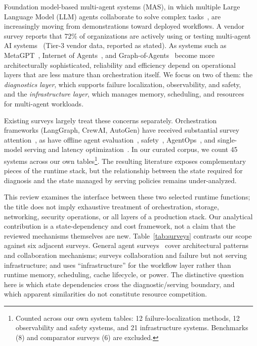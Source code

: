 Foundation model-based multi-agent systems (MAS), in which multiple Large Language Model (LLM) agents collaborate to solve complex tasks~\cite{metagpt2024, camel2023, chatdev2024}, are increasingly moving from demonstrations toward deployed workflows. A vendor survey reports that 72\% of organizations are actively using or testing multi-agent AI systems~\cite{zapier2025} (Tier-3 vendor data, reported as stated). As systems such as MetaGPT~\cite{metagpt2024}, Internet of Agents~\cite{ioa2025}, and Graph-of-Agents~\cite{graphofagents2026} become more architecturally sophisticated, reliability and efficiency depend on operational layers that are less mature than orchestration itself. We focus on two of them: the \emph{diagnostics layer}, which supports failure localization, observability, and safety, and the \emph{infrastructure layer}, which manages memory, scheduling, and resources for multi-agent workloads.

Existing surveys largely treat these concerns separately. Orchestration frameworks (LangGraph, CrewAI, AutoGen) have received substantial survey attention~\cite{zhu2026orchestration}, as have offline agent evaluation~\cite{evalbenchmark2025, evalagents2026, llmbenchsurvey2025}, safety~\cite{safellmagentsurvey2026, trustworthyagents2025}, AgentOps~\cite{agentopssurvey2025, agentopscsiro2024, architectingops2026}, and single-model serving and latency optimization~\cite{latencysurvey2026}. In our curated corpus, we count 45 systems across our own tables\footnote{Counted across our own system tables: 12 failure-localization methods, 12 observability and safety systems, and 21 infrastructure systems. Benchmarks (8) and comparator surveys (6) are excluded.}. The resulting literature exposes complementary pieces of the runtime stack, but the relationship between the state required for diagnosis and the state managed by serving policies remains under-analyzed.

This review examines the interface between these two selected runtime functions; the title does not imply exhaustive treatment of orchestration, storage, networking, security operations, or all layers of a production stack. Our analytical contribution is a state-dependency and cost framework, not a claim that the reviewed mechanisms themselves are new. Table~\ref{tab:surveys} contrasts our scope against six adjacent surveys. General agent surveys~\cite{li2024, abouali2025, wang2026classical, tran2025} cover architectural patterns and collaboration mechanisms; \cite{beyondindiv2026} surveys collaboration and failure but not serving infrastructure; and \cite{li2024} uses ``infrastructure'' for the workflow layer rather than runtime memory, scheduling, cache lifecycle, or power. The distinctive question here is which state dependencies cross the diagnostic/serving boundary, and which apparent similarities do not constitute resource competition.

